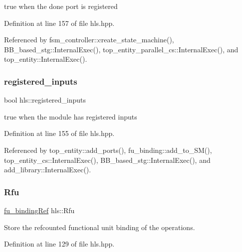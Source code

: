true when the done port is registered 



Definition at line 157 of file hls.\+hpp.



Referenced by fsm\+\_\+controller\+::create\+\_\+state\+\_\+machine(), B\+B\+\_\+based\+\_\+stg\+::\+Internal\+Exec(), top\+\_\+entity\+\_\+parallel\+\_\+cs\+::\+Internal\+Exec(), and top\+\_\+entity\+::\+Internal\+Exec().

\mbox{\label{classhls_a971fc57c719e998d35487786bf705edf}} 
\subsubsection{\texorpdfstring{registered\+\_\+inputs}{registered\_inputs}}
{\footnotesize\ttfamily bool hls\+::registered\+\_\+inputs}



true when the module has registered inputs 



Definition at line 155 of file hls.\+hpp.



Referenced by top\+\_\+entity\+::add\+\_\+ports(), fu\+\_\+binding\+::add\+\_\+to\+\_\+\+S\+M(), top\+\_\+entity\+\_\+cs\+::\+Internal\+Exec(), B\+B\+\_\+based\+\_\+stg\+::\+Internal\+Exec(), and add\+\_\+library\+::\+Internal\+Exec().

\mbox{\label{classhls_a98ce478f5726273b5978a18df5bbe3c3}} 
\subsubsection{\texorpdfstring{Rfu}{Rfu}}
{\footnotesize\ttfamily \hyperlink{fu__binding_8hpp_a619181df8ab98d7b7e17de58ac44b065}{fu\+\_\+binding\+Ref} hls\+::\+Rfu}



Store the refcounted functional unit binding of the operations. 



Definition at line 129 of file hls.\+hpp.



